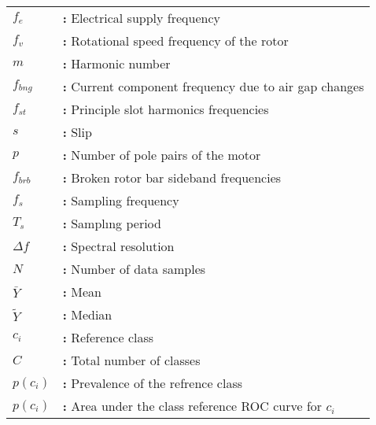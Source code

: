 \begin{tabular}{@{}p{2cm}l}
{\bf{$f_e$}} & {\bf:} Electrical supply frequency\\
{\bf{$f_v$}} & {\bf:} Rotational speed frequency of the rotor\\
{\bf{$m$}} & {\bf:} Harmonic number\\
{\bf{$f_{bng}$}} & {\bf:} Current component frequency due to air gap changes\\
{\bf{$f_{st}$}} & {\bf:} Principle slot harmonics frequencies\\
{\bf{$s$}} & {\bf:} Slip\\
{\bf{$p$}} & {\bf:} Number of pole pairs of the motor\\
{\bf{$f_{brb}$}} & {\bf:} Broken rotor bar sideband frequencies\\
{\bf{$f_s$}} & {\bf:} Sampling frequency\\
{\bf{$T_s$}} & {\bf:} Samplıng period\\
{\bf{$\varDelta f$}} & {\bf:} Spectral resolution\\
{\bf{$N$}} & {\bf:} Number of data samples\\
{\bf{$\bar{Y}$}} & {\bf:} Mean\\
{\bf{$\tilde{Y}$}} & {\bf:} Median\\
{\bf{$c_i$}} & {\bf:} Reference class\\
{\bf{$C$}} & {\bf:} Total number of classes\\
{\bf{$p(c_i)$}} & {\bf:} Prevalence of the refrence class\\
{\bf{$p(c_i)$}} & {\bf:} Area under the class reference ROC curve for $c_i$\\

\end{tabular}

